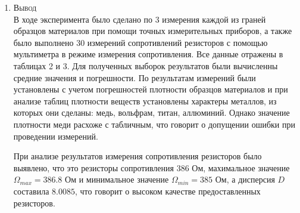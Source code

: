 \documentclass[12pt]{article}
\begin{document}
\begin{enumerate}
    \item \large\textsc{Вывод}
\\ В ходе эксперимента было сделано по 3 измерения каждой из граней образцов материалов при помощи точных измерительных приборов, а также было выполнено 30 измерений сопротивлений резисторов с помощью мультиметра в режиме измерения сопротивления. Все данные отражены в таблицах 2 и 3. Для полученных выборок результатов были вычисленны средние значения и погрешности.%
По результатам измерений были установлены с учетом погрешностей плотности образцов материалов и при анализе таблиц плотности веществ установлены характеры металлов, из которых они сделаны: медь, вольфрам, титан, аллюминий. Однако значение плотности меди расхоже с табличным, что говорит о допущении ошибки при проведении измерений. \par
При анализе результатов измерения сопротивления резисторов было выявлено, что это резисторы сопротивления 386 Ом, махимальное значение $\Omega_{max}=386.8$ Ом и минимальное значение $\Omega_{min}=385$ Ом, а дисперсия $D$ составила $8.0085$, что говорит о высоком качестве предоставленных резисторов.\par
\end{enumerate}
\end{document}
